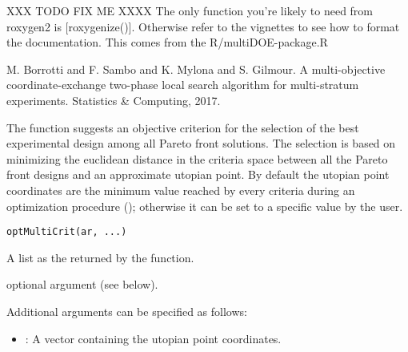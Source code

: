 \documentclass[a4paper]{book}
\begin{document}
%
\begin{Details}\relax
XXX TODO FIX ME XXXX The only function you're likely to need from roxygen2 is [roxygenize()].
Otherwise refer to the vignettes to see how to format the documentation.
This comes from the R/multiDOE-package.R
\end{Details}
%
\begin{References}\relax
M. Borrotti and F. Sambo and K. Mylona and S. Gilmour. A multi-objective
coordinate-exchange two-phase local search algorithm for multi-stratum
experiments. Statistics \& Computing, 2017.
\end{References}
%
\begin{Description}\relax
The  function suggests an objective criterion
for the selection of the best experimental design among all Pareto front solutions.
The selection is based on minimizing the euclidean distance in the criteria space
between all the Pareto front designs and an approximate utopian point. By default
the utopian point coordinates are the minimum value reached by every criteria
during an optimization procedure (); otherwise
it can be set to a specific value by the user.
\end{Description}
%
\begin{Usage}
\begin{verbatim}
optMultiCrit(ar, ...)
\end{verbatim}
\end{Usage}
%
\begin{Arguments}
\begin{ldescription}
\item[\code{ar}] A list as the  returned by the  function.

\item[\code{...}] optional argument (see below).
\end{ldescription}
\end{Arguments}
%
\begin{Details}\relax
Additional arguments can be specified as follows:
\begin{itemize}

\item{} : A vector containing the utopian point coordinates.

\end{itemize}

\end{Details}
\end{document}
